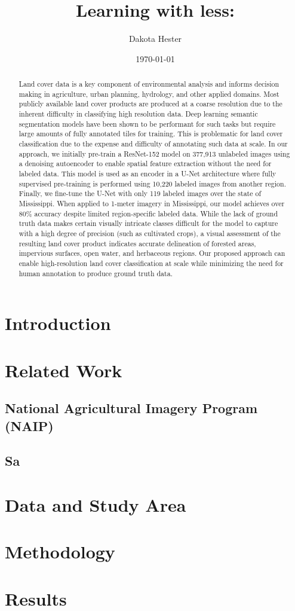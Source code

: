 \documentclass{article}
\title{Learning with less: }
\author{Dakota Hester}
\date{\today}
\begin{document}
\maketitle

\begin{abstract}
    Land cover data is a key component of environmental analysis and informs decision making in agriculture, urban planning, hydrology, and other applied domains. Most publicly available land cover products are produced at a coarse resolution due to the inherent difficulty in classifying high resolution data. Deep learning semantic segmentation models have been shown to be performant for such tasks but require large amounts of fully annotated tiles for training. This is problematic for land cover classification due to the expense and difficulty of annotating such data at scale. In our approach, we initially pre-train a ResNet-152 model on 377,913 unlabeled images using a denoising autoencoder to enable spatial feature extraction without the need for labeled data. This model is used as an encoder in a U-Net architecture where fully supervised pre-training is performed using 10,220 labeled images from another region. Finally, we fine-tune the U-Net with only 119 labeled images over the state of Mississippi. When applied to 1-meter imagery in Mississippi, our model achieves over 80\% accuracy despite limited region-specific labeled data. While the lack of ground truth data makes certain visually intricate classes difficult for the model to capture with a high degree of precision (such as cultivated crops), a visual assessment of the resulting land cover product indicates accurate delineation of forested areas, impervious surfaces, open water, and herbaceous regions. Our proposed approach can enable high-resolution land cover classification at scale while minimizing the need for human annotation to produce ground truth data.
\end{abstract}

\section{Introduction}

\section{Related Work}

\subsection{National Agricultural Imagery Program (NAIP)}

\subsection{Sa}

\section{Data and Study Area}

\section{Methodology}

\section{Results}
\end{document}
